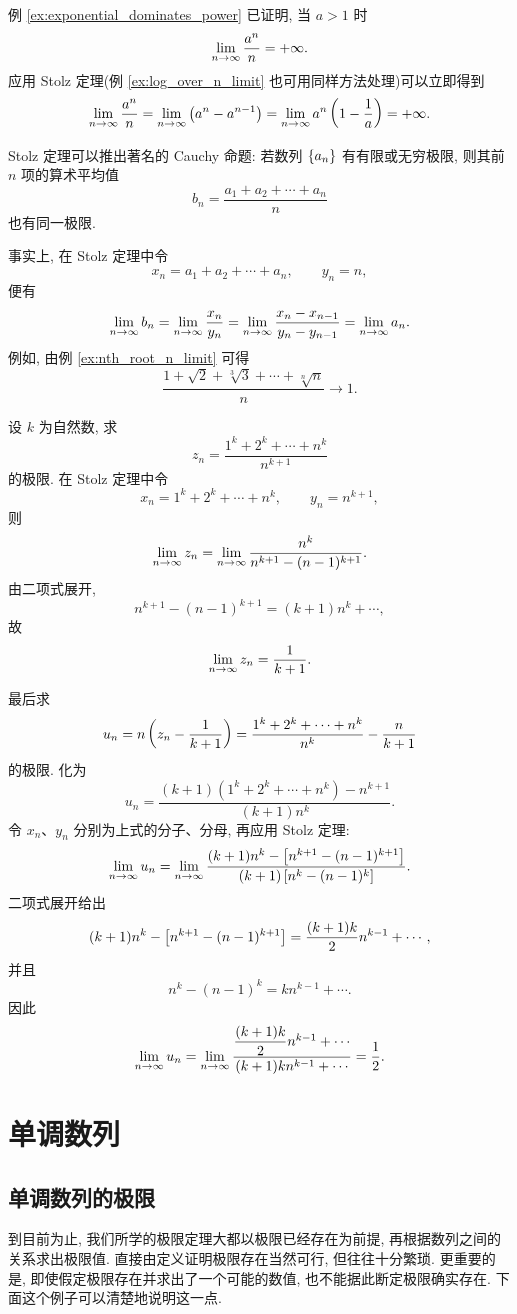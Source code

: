 \label{ex:stolz_exponential_over_n}
例 \ref{ex:exponential_dominates_power} 已证明, 当 $a>1$ 时
$$
\lim\limits_{n \to \infty}\frac{a^n}{n}=+\infty.
$$
应用 Stolz 定理(例 \ref{ex:log_over_n_limit} 也可用同样方法处理)可以立即得到
$$
\lim\limits_{n \to \infty}\frac{a^n}{n}
=\lim\limits_{n \to \infty}\left( a^n-a^{n-1} \right)
=\lim\limits_{n \to \infty}a^n\left( 1-\frac1a \right)
=+\infty.
$$

\label{ex:cesaro_mean}
Stolz 定理可以推出著名的 Cauchy 命题:{\kaishu
若数列 $\{a_{n}\}$ 有有限或无穷极限, 则其前 $n$ 项的算术平均值
$$
b_n=\frac{a_1+a_2+\cdots+a_n}{n}
$$
也有同一极限.
}

事实上, 在 Stolz 定理中令
$$
x_n=a_1+a_2+\cdots+a_n,\qquad y_n=n,
$$
便有
$$
\lim\limits_{n \to \infty}b_n
=\lim\limits_{n \to \infty}\frac{x_n}{y_n}
=\lim\limits_{n \to \infty}\frac{x_n-x_{n-1}}{y_n-y_{n-1}}
=\lim\limits_{n \to \infty}a_n.
$$
例如, 由例 \ref{ex:nth_root_n_limit} 可得
$$
\frac{1+\sqrt2+\sqrt[3]{3}+\cdots+\sqrt[n]{n}}{n}\to1.
$$

\label{ex:power_sum_asymptotic}
设 $k$ 为自然数, 求
$$
z_n=\frac{1^k+2^k+\cdots+n^k}{n^{k+1}}
$$
的极限. 在 Stolz 定理中令
$$
x_n=1^k+2^k+\cdots+n^k,\qquad y_n=n^{k+1},
$$
则
$$
\lim\limits_{n \to \infty}z_n
=\lim\limits_{n \to \infty}\frac{n^k}{n^{k+1}-(n-1)^{k+1}}.
$$
由二项式展开,
$$
n^{k+1}-(n-1)^{k+1}=(k+1)n^k+\cdots,
$$
故
$$
\lim\limits_{n \to \infty}z_n=\frac{1}{k+1}.
$$

\label{ex:power_sum_second_term}
最后求
$$
u_n=n\left( z_n-\frac{1}{k+1} \right)
=\frac{1^k+2^k+\cdots+n^k}{n^k}-\frac{n}{k+1}
$$
的极限. 化为
$$
u_n=
\frac{(k+1)(1^k+2^k+\cdots+n^k)-n^{k+1}}{(k+1)n^k}.
$$
令 $x_n$、$y_n$ 分别为上式的分子、分母, 再应用 Stolz 定理:
$$
\lim\limits_{n \to \infty}u_n
=\lim\limits_{n \to \infty}
\frac{(k+1)n^k-\left[ n^{k+1}-(n-1)^{k+1} \right]}
{(k+1)\left[ n^k-(n-1)^k \right]}.
$$
二项式展开给出
$$
(k+1)n^k-\left[ n^{k+1}-(n-1)^{k+1} \right]
=\frac{(k+1)k}{2}n^{k-1}+\cdots,
$$
并且
$$
n^k-(n-1)^k=kn^{k-1}+\cdots.
$$
因此
$$
\lim\limits_{n \to \infty}u_n
=\lim\limits_{n \to \infty}
\frac{\dfrac{(k+1)k}{2}n^{k-1}+\cdots}
{(k+1)kn^{k-1}+\cdots}
=\frac12.
$$

\section{单调数列}\label{sec:monotone_sequences}
\subsection{单调数列的极限}\label{subsec:34}
到目前为止, 我们所学的极限定理大都以极限已经存在为前提,
再根据数列之间的关系求出极限值. 直接由定义证明极限存在当然可行,
但往往十分繁琐. 更重要的是, 即使假定极限存在并求出了一个可能的数值,
也不能据此断定极限确实存在. 下面这个例子可以清楚地说明这一点.

